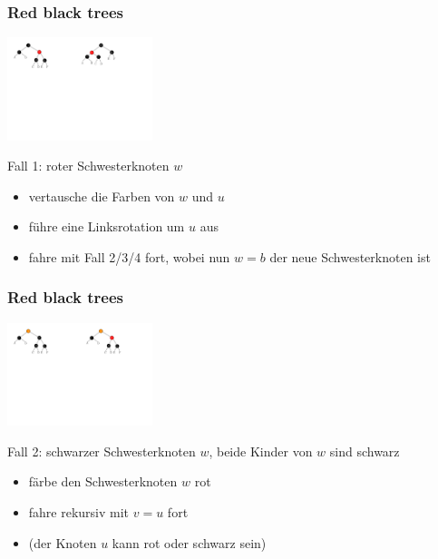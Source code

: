 \documentclass[aspectratio=1610, 11pt]{beamer}
\newcommand{\mytitle}{Red black trees}
\begin{document}
\begin{frame}\frametitle{\mytitle}
	\includegraphics[height=30mm]{./images/rbtree_del_1.pdf}\hfill\includegraphics[height=30mm]{./images/rbtree_del_1a.pdf}
	\begin{exampleblock}{Fall 1: roter Schwesterknoten $w$}
		\begin{itemize}
			\item vertausche die Farben von $w$ und $u$
			\item f\"uhre eine Linksrotation um $u$ aus
			\item fahre mit Fall 2/3/4 fort, wobei nun $w=b$ der neue Schwesterknoten ist
		\end{itemize}
	\end{exampleblock}
\end{frame}

\begin{frame}\frametitle{\mytitle}
	\includegraphics[height=30mm]{./images/rbtree_del_2.pdf}\hfill\includegraphics[height=30mm]{./images/rbtree_del_2a.pdf}
	\begin{exampleblock}{Fall 2: schwarzer Schwesterknoten $w$, beide Kinder von $w$ sind schwarz}
		\begin{itemize}
			\item f\"arbe den Schwesterknoten $w$ rot
			\item fahre rekursiv mit $v=u$ fort
			\item (der Knoten $u$ kann rot oder schwarz sein)
		\end{itemize}
	\end{exampleblock}
\end{frame}
\end{document}
